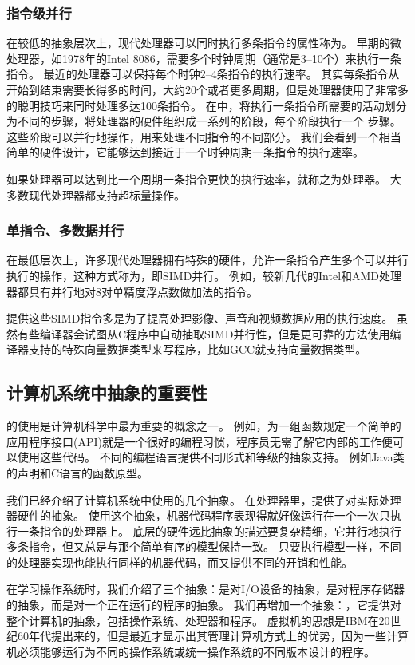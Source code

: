 {{        \subsubsection{指令级并行}
        {
            在较低的抽象层次上，现代处理器可以同时执行多条指令的属性称为。
            早期的微处理器，如1978年的Intel 8086，需要多个时钟周期（通常是3--10个）来执行一条指令。
            最近的处理器可以保持每个时钟2--4条指令的执行速率。
            其实每条指令从开始到结束需要长得多的时间，大约20个或者更多周期，但是处理器使用了非常多的聪明技巧来同时处理多达100条指令。
            在中，将执行一条指令所需要的活动划分为不同的步骤，将处理器的硬件组织成一系列的阶段，每个阶段执行一个 步骤。
            这些阶段可以并行地操作，用来处理不同指令的不同部分。
            我们会看到一个相当简单的硬件设计，它能够达到接近于一个时钟周期一条指令的执行速率。

            如果处理器可以达到比一个周期一条指令更快的执行速率，就称之为处理器。
            大多数现代处理器都支持超标量操作。
        }

        \subsubsection{单指令、多数据并行}
        {
            在最低层次上，许多现代处理器拥有特殊的硬件，允许一条指令产生多个可以并行执行的操作，这种方式称为，即SIMD并行。
            例如，较新几代的Intel和AMD处理器都具有并行地对8对单精度浮点数做加法的指令。

            提供这些SIMD指令多是为了提高处理影像、声音和视频数据应用的执行速度。
            虽然有些编译器会试图从C程序中自动抽取SIMD并行性，但是更可靠的方法使用编译器支持的特殊向量数据类型来写程序，比如GCC就支持向量数据类型。
        }
    }

    \subsection{计算机系统中抽象的重要性}
    {
        的使用是计算机科学中最为重要的概念之一。
        例如，为一组函数规定一个简单的应用程序接口(API)就是一个很好的编程习惯，程序员无需了解它内部的工作便可以使用这些代码。
        不同的编程语言提供不同形式和等级的抽象支持。
        例如Java类的声明和C语言的函数原型。

        我们已经介绍了计算机系统中使用的几个抽象。
        在处理器里，提供了对实际处理器硬件的抽象。
        使用这个抽象，机器代码程序表现得就好像运行在一个一次只执行一条指令的处理器上。
        底层的硬件远比抽象的描述要复杂精细，它并行地执行多条指令，但又总是与那个简单有序的模型保持一致。
        只要执行模型一样，不同的处理器实现也能执行同样的机器代码，而又提供不同的开销和性能。

        在学习操作系统时，我们介绍了三个抽象：是对I/O设备的抽象，是对程序存储器的抽象，而是对一个正在运行的程序的抽象。
        我们再增加一个抽象：，它提供对整个计算机的抽象，包括操作系统、处理器和程序。
        虚拟机的思想是IBM在20世纪60年代提出来的，但是最近才显示出其管理计算机方式上的优势，因为一些计算机必须能够运行为不同的操作系统或统一操作系统的不同版本设计的程序。
    }
}

\endinput
